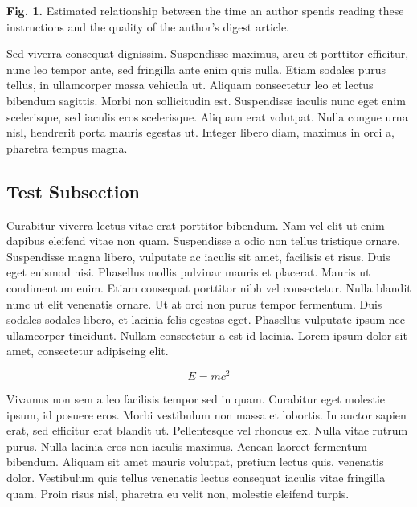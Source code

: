 \documentclass[10pt]{article}
\begin{document}
\begin{multicols}{2}
\label{fig:author-time}

\vspace{3pt}

{\fontsize{9pt}{10pt}\selectfont
\noindent\textbf{Fig. 1.} \hspace{0.5in} Estimated relationship between the time an author spends reading these instructions and the quality of the author's digest article.
}

\vspace{12pt}


Sed viverra consequat dignissim. Suspendisse maximus, arcu et porttitor efficitur, nunc leo tempor ante, sed fringilla ante enim quis nulla. Etiam sodales purus tellus, in ullamcorper massa vehicula ut. Aliquam consectetur leo et lectus bibendum sagittis. Morbi non sollicitudin est. Suspendisse iaculis nunc eget enim scelerisque, sed iaculis eros scelerisque. Aliquam erat volutpat. Nulla congue urna nisl, hendrerit porta mauris egestas ut. Integer libero diam, maximus in orci a, pharetra tempus magna.

\subsection{Test Subsection}
Curabitur viverra lectus vitae erat porttitor bibendum. Nam vel elit ut enim dapibus eleifend vitae non quam. Suspendisse a odio non tellus tristique ornare. Suspendisse magna libero, vulputate ac iaculis sit amet, facilisis et risus. Duis eget euismod nisi. Phasellus mollis pulvinar mauris et placerat. Mauris ut condimentum enim. Etiam consequat porttitor nibh vel consectetur. Nulla blandit nunc ut elit venenatis ornare. Ut at orci non purus tempor fermentum. Duis sodales sodales libero, et lacinia felis egestas eget. Phasellus vulputate ipsum nec ullamcorper tincidunt. Nullam consectetur a est id lacinia. Lorem ipsum dolor sit amet, consectetur adipiscing elit.

\begin{equation}
E = mc^2
\end{equation}

Vivamus non sem a leo facilisis tempor sed in quam. Curabitur eget molestie ipsum, id posuere eros. Morbi vestibulum non massa et lobortis. In auctor sapien erat, sed efficitur erat blandit ut. Pellentesque vel rhoncus ex. Nulla vitae rutrum purus. Nulla lacinia eros non iaculis maximus. Aenean laoreet fermentum bibendum. Aliquam sit amet mauris volutpat, pretium lectus quis, venenatis dolor. Vestibulum quis tellus venenatis lectus consequat iaculis vitae fringilla quam. Proin risus nisl, pharetra eu velit non, molestie eleifend turpis.

\end{multicols}
\end{document}
